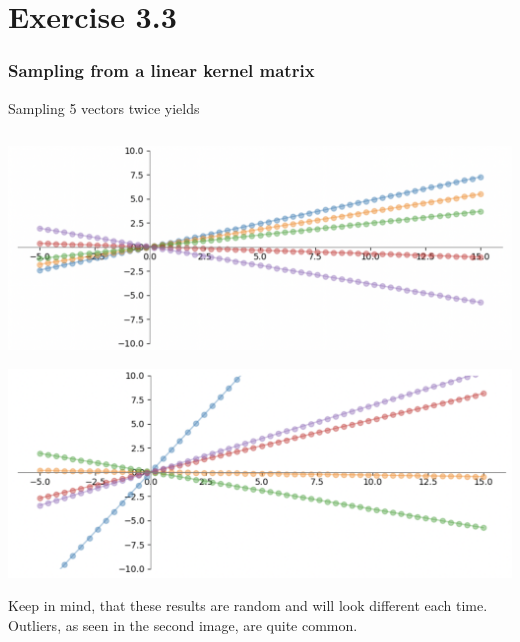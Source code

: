 \documentclass[10pt,aspectratio=169,handout]{beamer}
\begin{document}
\section{Exercise 3.3}

\begin{frame}
    \frametitle{Sampling from a linear kernel matrix}

    Sampling 5 vectors twice yields

    \inputminted[bgcolor=LightGray,fontsize=\small]{python}{code/linear_sampling.py}

    \begin{minipage}{0.49\textwidth}
        \includegraphics[width=\textwidth]{images/ex3.3.1a.png}
    \end{minipage}
    \begin{minipage}{0.49\textwidth}
        \includegraphics[width=\textwidth]{images/ex3.3.1b.png}
    \end{minipage}

    Keep in mind, that these results are random and will look different each time.
    Outliers, as seen in the second image, are quite common.

\end{frame}
\end{document}
